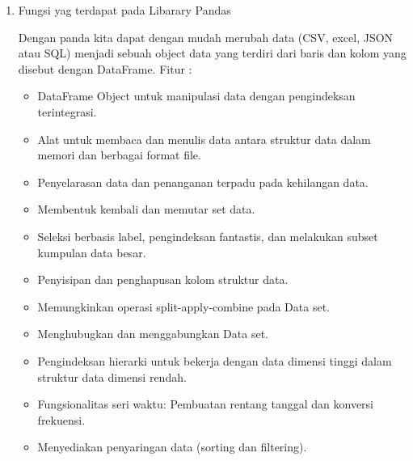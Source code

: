\begin{enumerate}
\item Fungsi yag terdapat pada Libarary Pandas

Dengan panda kita dapat dengan mudah merubah data (CSV, excel, JSON atau SQL) menjadi sebuah object data yang terdiri dari baris dan kolom yang disebut dengan DataFrame.
Fitur :

\begin{itemize}

\item DataFrame Object untuk manipulasi data dengan pengindeksan terintegrasi.
\item Alat untuk membaca dan menulis data antara struktur data dalam memori dan berbagai format file.
\item Penyelarasan data dan penanganan terpadu pada kehilangan data.
\item Membentuk kembali dan memutar set data.
\item Seleksi berbasis label, pengindeksan fantastis, dan melakukan subset kumpulan data besar.
\item Penyisipan dan penghapusan kolom struktur data.
\item Memungkinkan operasi split-apply-combine pada Data set.
\item Menghubugkan dan menggabungkan Data set.
\item Pengindeksan hierarki untuk bekerja dengan data dimensi tinggi dalam struktur data dimensi rendah.
\item Fungsionalitas seri waktu: Pembuatan rentang tanggal dan konversi frekuensi.
\item Menyediakan penyaringan data (sorting dan filtering).
\end{itemize}


\end{enumerate}